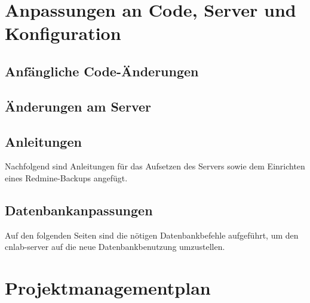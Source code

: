 \documentclass[12pt, a4paper]{report}
\begin{document}
	
	
	
	\chapter{Anpassungen an Code, Server und Konfiguration}
	
	\section{Anfängliche Code-Änderungen}
	\label{sec:AnfaenglicheCodeAenderungen}
	
	
	\section{Änderungen am Server}
	\label{sec:AenderungenAmServer}
	
	
	\section{Anleitungen}
	\label{sec:Anleitungen}
	Nachfolgend sind Anleitungen für das Aufsetzen des Servers sowie dem Einrichten eines Redmine-Backups angefügt.
	
	
	
	
	\section{Datenbankanpassungen}
	\label{sec:Datenbankanpassungen}
	Auf den folgenden Seiten sind die nötigen Datenbankbefehle aufgeführt, um den cnlab-server auf die neue Datenbankbenutzung umzustellen.
	
	
	\chapter{Projektmanagementplan}
	
\end{document}
